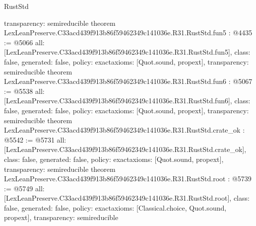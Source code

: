 \begin{lexlean}{RustStd}
\begin{coremodule}
{  transparency: semireducible
}
theorem LexLeanPreserve.C33acd439f913b86f59462349c141036e.R31.RustStd.fun5 : @4435 := @5066 {
  all: [LexLeanPreserve.C33acd439f913b86f59462349c141036e.R31.RustStd.fun5],
  class: false,
  generated: false,
  policy: exact{axioms: [Quot.sound, propext]},
  transparency: semireducible
}
theorem LexLeanPreserve.C33acd439f913b86f59462349c141036e.R31.RustStd.fun6 : @5067 := @5538 {
  all: [LexLeanPreserve.C33acd439f913b86f59462349c141036e.R31.RustStd.fun6],
  class: false,
  generated: false,
  policy: exact{axioms: [Quot.sound, propext]},
  transparency: semireducible
}
theorem LexLeanPreserve.C33acd439f913b86f59462349c141036e.R31.RustStd.crate_ok : @5542 := @5731 {
  all: [LexLeanPreserve.C33acd439f913b86f59462349c141036e.R31.RustStd.crate_ok],
  class: false,
  generated: false,
  policy: exact{axioms: [Quot.sound, propext]},
  transparency: semireducible
}
theorem LexLeanPreserve.C33acd439f913b86f59462349c141036e.R31.RustStd.root : @5739 := @5749 {
  all: [LexLeanPreserve.C33acd439f913b86f59462349c141036e.R31.RustStd.root],
  class: false,
  generated: false,
  policy: exact{axioms: [Classical.choice, Quot.sound, propext]},
  transparency: semireducible
}


\end{coremodule}
\end{lexlean}
